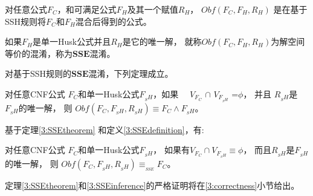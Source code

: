 \begin{definition}\label{3:OBFUSCATORSSH_old}
对任意公式$F_C$，和可满足公式$F_H$及其一个赋值$R_H$，
$Obf(F_C,F_H,R_H)$ 是在基于SSH规则将$F_C$和$F_H$混合后得到的公式。
\end{definition}

\begin{definition}[SSE混淆]\label{3:OBFUSCATORSSH}
如果$F_H$是单一Husk公式并且$R_H$是它的唯一解，
就称$Obf(F_C,F_H,R_H)$为解空间等价的混淆，称为${\textbf{SSE混淆}}$。

\end{definition}

对基于SSH规则的${\textbf{SSE混淆}}$，下列定理成立。


\begin{theorem}\label{3:SSEtheorem}
对任意CNF公式 $F_C$和单一Husk公式$F_{_SH}$，如果
~~$V_{F_C}$ $\cap$ $V_{F_{_SH}}$ =$\phi$， 并且
$R_{_SH}$是$F_{_SH}$的唯一解，
则 $Obf(F_C,F_{_SH},R_{_SH}) \equiv F_C\wedge F_{_SH}$。
\end{theorem}

基于定理\ref{3:SSEtheorem} 和定义\ref{3:SSEdefinition}，有:

\begin{theorem}\label{3:SSEinference}
对任意CNF公式 $F_C$和单一Husk公式$F_{_SH}$，
如果有$V_{F_C}\cap V_{F_{_SH}}\equiv \phi$，
而且$R_{_SH}$是$F_{_SH}$的唯一解，
则 $Obf(F_C,F_{_SH},R_{_SH}) \equiv_{_{SSE}} F_C$。
\end{theorem}




定理\ref{3:SSEtheorem}和\ref{3:SSEinference}的严格证明将在\ref{3:correctness}小节给出。


